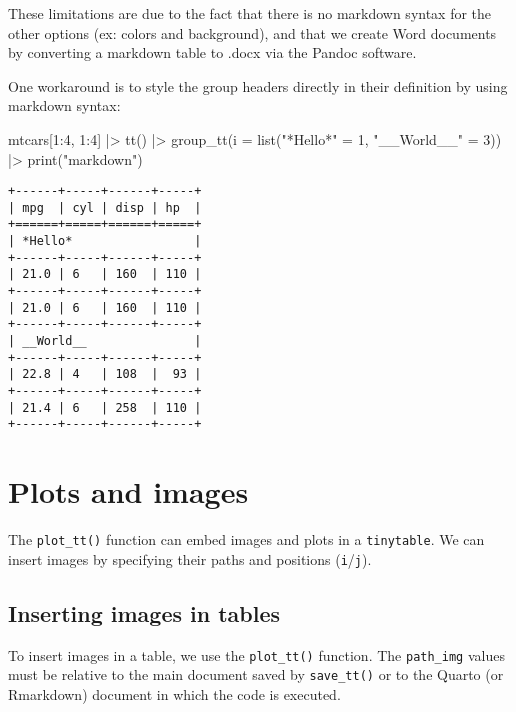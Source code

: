 \documentclass[
  letterpaper,
  DIV=11,
  numbers=noendperiod]{scrartcl}
\newenvironment{Shaded}{\begin{snugshade}}{\end{snugshade}}
\newcommand{\AttributeTok}[1]{\textcolor[rgb]{0.40,0.45,0.13}{#1}}
\newcommand{\DecValTok}[1]{\textcolor[rgb]{0.68,0.00,0.00}{#1}}
\newcommand{\FunctionTok}[1]{\textcolor[rgb]{0.28,0.35,0.67}{#1}}
\newcommand{\NormalTok}[1]{\textcolor[rgb]{0.00,0.23,0.31}{#1}}
\newcommand{\OtherTok}[1]{\textcolor[rgb]{0.00,0.23,0.31}{#1}}
\newcommand{\SpecialCharTok}[1]{\textcolor[rgb]{0.37,0.37,0.37}{#1}}
\newcommand{\StringTok}[1]{\textcolor[rgb]{0.13,0.47,0.30}{#1}}
\begin{document}
These limitations are due to the fact that there is no markdown syntax
for the other options (ex: colors and background), and that we create
Word documents by converting a markdown table to .docx via the Pandoc
software.

One workaround is to style the group headers directly in their
definition by using markdown syntax:

\begin{Shaded}
\begin{Highlighting}[]
\NormalTok{mtcars[}\DecValTok{1}\SpecialCharTok{:}\DecValTok{4}\NormalTok{, }\DecValTok{1}\SpecialCharTok{:}\DecValTok{4}\NormalTok{] }\SpecialCharTok{|\textgreater{}}
  \FunctionTok{tt}\NormalTok{() }\SpecialCharTok{|\textgreater{}}
  \FunctionTok{group\_tt}\NormalTok{(}\AttributeTok{i =} \FunctionTok{list}\NormalTok{(}\StringTok{"*Hello*"} \OtherTok{=} \DecValTok{1}\NormalTok{, }\StringTok{"\_\_World\_\_"} \OtherTok{=} \DecValTok{3}\NormalTok{)) }\SpecialCharTok{|\textgreater{}}
  \FunctionTok{print}\NormalTok{(}\StringTok{"markdown"}\NormalTok{)}
\end{Highlighting}
\end{Shaded}

\begin{verbatim}
+------+-----+------+-----+
| mpg  | cyl | disp | hp  |
+======+=====+======+=====+
| *Hello*                 |
+------+-----+------+-----+
| 21.0 | 6   | 160  | 110 |
+------+-----+------+-----+
| 21.0 | 6   | 160  | 110 |
+------+-----+------+-----+
| __World__               |
+------+-----+------+-----+
| 22.8 | 4   | 108  |  93 |
+------+-----+------+-----+
| 21.4 | 6   | 258  | 110 |
+------+-----+------+-----+ 
\end{verbatim}

\section{Plots and images}\label{plots-and-images}

The \texttt{plot\_tt()} function can embed images and plots in a
\texttt{tinytable}. We can insert images by specifying their paths and
positions (\texttt{i}/\texttt{j}).

\subsection{Inserting images in
tables}\label{inserting-images-in-tables}

To insert images in a table, we use the \texttt{plot\_tt()} function.
The \texttt{path\_img} values must be relative to the main document
saved by \texttt{save\_tt()} or to the Quarto (or Rmarkdown) document in
which the code is executed.
\end{document}
